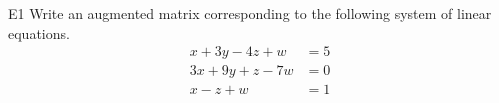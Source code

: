 \documentclass{sbgLAquiz}
\begin{document}
\begin{problem}{E1}
Write an augmented matrix corresponding to the following system of linear equations.
\begin{align*}
x+3y-4z +w &= 5 \\
3x+9y+z-7w &= 0 \\
x-z +w &= 1
\end{align*}
\end{problem}
\end{document}
